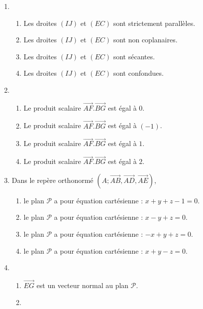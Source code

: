 \begin{enumerate}
     \item
     \begin{enumerate}
          \item
          Les droites $\left(IJ\right)$ et $\left(EC\right)$ sont strictement parallèles.
          \item
          Les droites $\left(IJ\right)$ et $\left(EC\right)$ sont non coplanaires.
          \item
          Les droites $\left(IJ\right)$ et $\left(EC\right)$ sont sécantes.
          \item
     Les droites $\left(IJ\right)$ et $\left(EC\right)$ sont confondues.\end{enumerate}
     \item
     \begin{enumerate}
          \item
          Le produit scalaire $\overrightarrow{AF}.\overrightarrow{BG}$ est égal à $0$.
          \item
          Le produit scalaire $\overrightarrow{AF}.\overrightarrow{BG}$ est égal à $\left(-1\right)$.
          \item
          Le produit scalaire $\overrightarrow{AF}.\overrightarrow{BG}$ est égal à $1$.
          \item
     Le produit scalaire $\overrightarrow{AF}.\overrightarrow{BG}$ est égal à $2$.\end{enumerate}
     \item
     Dans le repère orthonormé $\left(A ;  \overrightarrow{AB}, \overrightarrow{AD}, \overrightarrow{AE}\right)$,
     \begin{enumerate}
          \item
          le plan $\mathscr P$ a pour équation cartésienne : $x+y+z-1=0$.
          \item
          le plan $\mathscr P$ a pour équation cartésienne : $x-y+z=0$.
          \item
          le plan $\mathscr P$ a pour équation cartésienne : $-x+y+z=0$.
          \item
     le plan $\mathscr P$ a pour équation cartésienne : $x+y-z=0$.\end{enumerate}
     \item
     \begin{enumerate}
          \item
          $\overrightarrow{EG}$ est un vecteur normal au plan $\mathscr P$.
          \item

\end{enumerate}
\end{enumerate}

